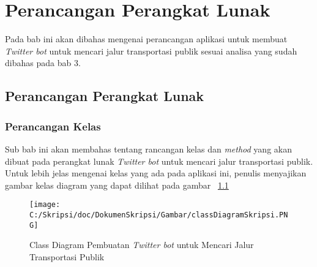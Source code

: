 \chapter{Perancangan Perangkat Lunak}
\label{chap:perancangan perangkat lunak}

Pada bab ini akan dibahas mengenai perancangan aplikasi untuk membuat \textit{Twitter bot} untuk mencari jalur transportasi publik sesuai analisa yang sudah dibahas pada bab 3.

\section{Perancangan Perangkat Lunak}

\subsection{Perancangan Kelas}
Sub bab ini akan membahas tentang rancangan kelas dan \textit{method} yang akan dibuat pada perangkat lunak \textit{Twitter bot} untuk mencari jalur transportasi publik. Untuk lebih jelas mengenai kelas yang ada pada aplikasi ini, penulis menyajikan gambar kelas diagram yang dapat dilihat pada gambar ~\ref{fig:classDiagramSkripsi}

\begin{figure}[htbp]
	\centering
		\texttt{[image: C:/Skripsi/doc/DokumenSkripsi/Gambar/classDiagramSkripsi.PNG]}
	\caption{Class Diagram Pembuatan \textit{Twitter bot} untuk Mencari Jalur Transportasi Publik}
	\label{fig:classDiagramSkripsi}
\end{figure}


